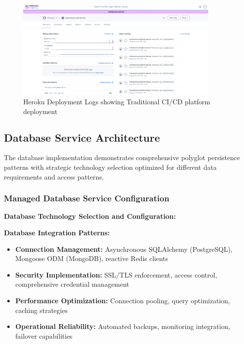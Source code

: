 \begin{figure}[H]
\centering
\includegraphics[width=0.9\textwidth]{figures/chapter5/heroku-deployment-logs.png}
\caption{Heroku Deployment Logs showing Traditional CI/CD platform deployment}
\label{fig:heroku-deployment-logs}
\end{figure}

\subsection{Database Service Architecture}

The database implementation demonstrates comprehensive polyglot persistence patterns with strategic technology selection optimized for different data requirements and access patterns.

\subsubsection{Managed Database Service Configuration}

\textbf{Database Technology Selection and Configuration:}



\textbf{Database Integration Patterns:}
\begin{itemize}
\item \textbf{Connection Management:} Asynchronous SQLAlchemy (PostgreSQL), Mongoose ODM (MongoDB), reactive Redis clients
\item \textbf{Security Implementation:} SSL/TLS enforcement, access control, comprehensive credential management
\item \textbf{Performance Optimization:} Connection pooling, query optimization, caching strategies
\item \textbf{Operational Reliability:} Automated backups, monitoring integration, failover capabilities
\end{itemize}

